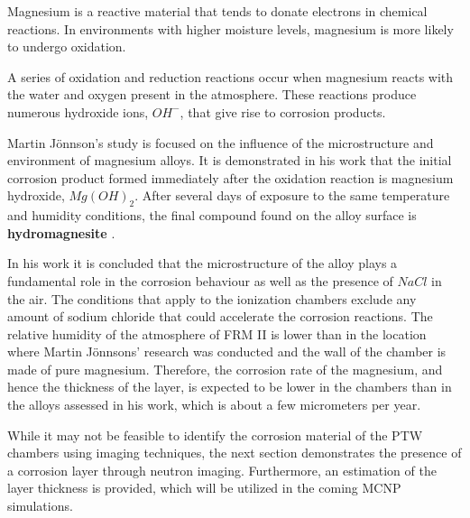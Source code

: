 Magnesium is a reactive material that tends to donate electrons in chemical reactions. In environments with higher moisture levels, magnesium is more likely to undergo oxidation. %

A series of oxidation and reduction reactions occur when magnesium reacts with the water and oxygen present in the atmosphere. These reactions produce numerous hydroxide ions, $OH^{-}$, that give rise to corrosion products. %

Martin Jönnson's study is focused on the influence of the microstructure and environment of magnesium alloys. It is demonstrated in his work that the initial corrosion product formed immediately after the oxidation reaction is magnesium hydroxide, $Mg(OH)_2$. 
After several days of exposure to the same temperature and humidity conditions, the final compound found on the alloy surface is \textbf{hydromagnesite} \cite{AtmosphericCorrosionMgAlloys}.

In his work it is concluded that the microstructure of the alloy plays a fundamental role in the corrosion behaviour as well as the presence of $NaCl$ in the air. The conditions that apply to the ionization chambers exclude any amount of sodium chloride that could accelerate the corrosion reactions. The relative humidity of the atmosphere of FRM II is lower than in the location where Martin Jönnsons' research was conducted and the wall of the chamber is made of pure magnesium. Therefore, the corrosion rate of the magnesium, and hence the thickness of the layer, is expected to be lower in the chambers than in the alloys assessed in his work, which is about a few micrometers per year.

While it may not be feasible to identify the corrosion material of the PTW chambers using imaging techniques, the next section demonstrates the presence of a corrosion layer through neutron imaging. Furthermore, an estimation  of the layer thickness is provided, which will be utilized in the coming MCNP simulations.